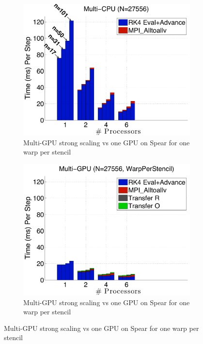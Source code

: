 \begin{figure}
\centering
\begin{subfigure}[t]{0.425\textwidth}
\centering
\includegraphics[width=1.0\textwidth]{../figures/spear_results/alltoallv_vortex/multiCPU_costs.pdf}
\caption{Multi-GPU strong scaling vs one GPU on Spear for one warp per stencil}
\label{fig:spear_alltoall_multigpu_vs_gpu_scaling}
\end{subfigure} 
\begin{subfigure}[t]{0.425\textwidth}
\centering
\includegraphics[width=1.0\textwidth]{../figures/spear_results/alltoallv_vortex/multiGPU_warp_costs.pdf}
\caption{Multi-GPU strong scaling vs one GPU on Spear for one warp per stencil}

\end{subfigure}
\end{figure}
